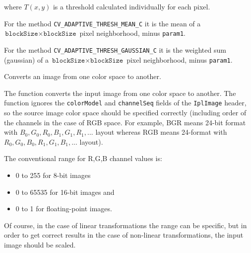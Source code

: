 where $T(x,y)$ is a threshold calculated individually for each pixel.

For the method \texttt{CV\_ADAPTIVE\_THRESH\_MEAN\_C} it is the mean of a $\texttt{blockSize} \times \texttt{blockSize}$ pixel neighborhood, minus \texttt{param1}.

For the method \texttt{CV\_ADAPTIVE\_THRESH\_GAUSSIAN\_C} it is the weighted sum (gaussian) of a $\texttt{blockSize} \times \texttt{blockSize}$ pixel neighborhood, minus \texttt{param1}.

Converts an image from one color space to another.


\begin{description}
\end{description}

The function converts the input image from one color
space to another. The function ignores the \texttt{colorModel} and
\texttt{channelSeq} fields of the \texttt{IplImage} header, so the
source image color space should be specified correctly (including
order of the channels in the case of RGB space. For example, BGR means 24-bit
format with $B_0, G_0, R_0, B_1, G_1, R_1, ...$ layout
whereas RGB means 24-format with $R_0, G_0, B_0, R_1, G_1, B_1, ...$
layout).

The conventional range for R,G,B channel values is:

\begin{itemize}
 \item 0 to 255 for 8-bit images
 \item 0 to 65535 for 16-bit images and
 \item 0 to 1 for floating-point images.
\end{itemize}

Of course, in the case of linear transformations the range can be
specific, but in order to get correct results in the case of non-linear
transformations, the input image should be scaled.

